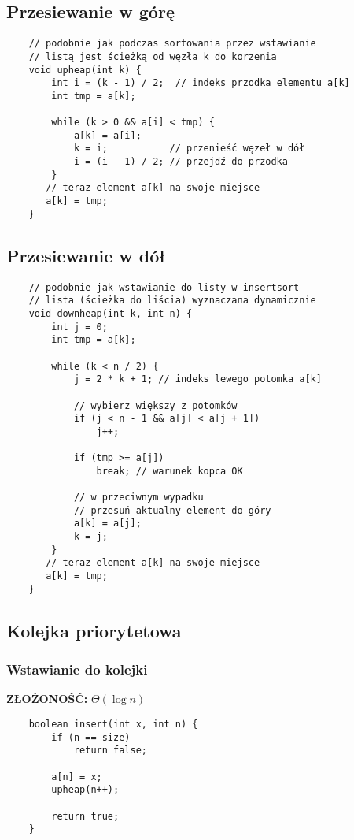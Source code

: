 \documentclass[algorytmy.tex]{subfiles}
\begin{document}
\subsection{Przesiewanie w górę}
\begin{verbatim}
    // podobnie jak podczas sortowania przez wstawianie
    // listą jest ścieżką od węzła k do korzenia
    void upheap(int k) {
        int i = (k - 1) / 2;  // indeks przodka elementu a[k]
        int tmp = a[k];

        while (k > 0 && a[i] < tmp) {
            a[k] = a[i];
            k = i;           // przenieść węzeł w dół
            i = (i - 1) / 2; // przejdź do przodka
        }
       // teraz element a[k] na swoje miejsce
       a[k] = tmp;
    }
\end{verbatim}

\subsection{Przesiewanie w dół}
\begin{verbatim}
    // podobnie jak wstawianie do listy w insertsort
    // lista (ścieżka do liścia) wyznaczana dynamicznie
    void downheap(int k, int n) {
        int j = 0;
        int tmp = a[k];

        while (k < n / 2) {
            j = 2 * k + 1; // indeks lewego potomka a[k]

            // wybierz większy z potomków
            if (j < n - 1 && a[j] < a[j + 1])
                j++;

            if (tmp >= a[j])
                break; // warunek kopca OK

            // w przeciwnym wypadku
            // przesuń aktualny element do góry
            a[k] = a[j];
            k = j;
        }
       // teraz element a[k] na swoje miejsce
       a[k] = tmp;
    }
\end{verbatim}

\subsection{Kolejka priorytetowa}
    \subsubsection{Wstawianie do kolejki}
        \textbf{ZŁOŻONOŚĆ:  } $\Theta(\log{n})$
\begin{verbatim}
    boolean insert(int x, int n) {
        if (n == size)
            return false;

        a[n] = x;
        upheap(n++);

        return true;
    }
\end{verbatim}
\end{document}
